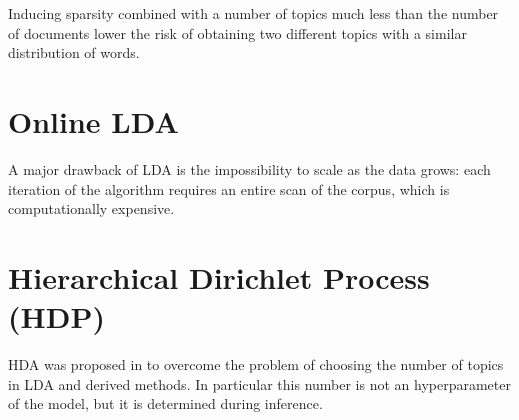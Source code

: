 Inducing sparsity combined with a number of topics much less than the number of documents 
lower the risk of obtaining two different topics with a similar distribution of words.


\section{Online LDA}
A major drawback of LDA is the impossibility to scale as the data grows:
each iteration of the algorithm requires an entire scan of the corpus, which is computationally expensive.

\section{Hierarchical Dirichlet Process (HDP)}
HDA was proposed in \cite{DBLP:journals/jmlr/WangPB11} to overcome the problem of choosing the number of topics in LDA and derived methods.
In particular this number is not an hyperparameter of the model, but it is determined during inference.
